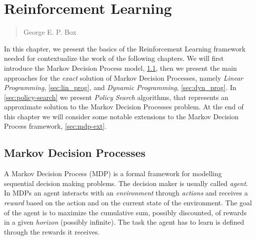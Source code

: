 \chapter{Reinforcement Learning}
\label{chapter2}
\thispagestyle{empty}

\begin{quotation}
{\footnotesize
{}
\begin{flushright}
George E. P. Box
\end{flushright}
}
\end{quotation}
\vspace{0.5cm}

\noindent In this chapter, we present the basics of the Reinforcement Learning framework needed for contextualize the work of the following chapters. We will first introduce the Markov Decision Process model, \cref{sec:MDP}, then we present the main approaches for the \textit{exact} solution of Markov Decision Processes, namely \textit{Linear Programming}, \cref{sec:lin_prog}, and \textit{Dynamic Programming}, \cref{sec:dyn_prog}. In \cref{sec:policy-search} we present \textit{Policy Search} algorithms, that represents an approximate solution to the Markov Decision Processes problem. At the end of this chapter we will consider some notable extensions to the Markov Decision Process framework, \cref{sec:mdp-ext}.
\section{Markov Decision Processes} \label{sec:MDP}
A Markov Decision Process \citep{puterman2014markov} (MDP) is a formal framework for modelling sequential decision making problems. The decision maker is usually called \textit{agent}.
 In MDPs an agent interacts with an \textit{environment} through \textit{actions} and receives a \textit{reward} based on the action and on the current state of the environment. The goal of the agent is to maximize the cumulative sum, possibly discounted, of rewards in a given \textit{horizon} (possibly infinite). The task the agent has to learn is defined through the rewards it receives. 
